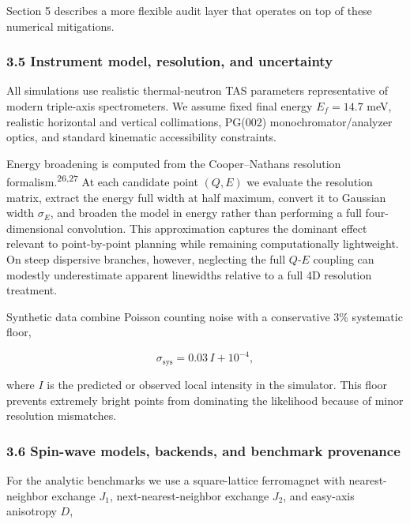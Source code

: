 \documentclass[
]{article}
\begin{document}
Section 5 describes a more flexible audit layer that operates on top of
these numerical mitigations.

\hypertarget{instrument-model-resolution-and-uncertainty}{%
\subsubsection{3.5 Instrument model, resolution, and
uncertainty}\label{instrument-model-resolution-and-uncertainty}}

All simulations use realistic thermal-neutron TAS parameters
representative of modern triple-axis spectrometers. We assume fixed
final energy \(E_f=14.7\) meV, realistic horizontal and vertical
collimations, PG(002) monochromator/analyzer optics, and standard
kinematic accessibility constraints.

Energy broadening is computed from the Cooper--Nathans resolution
formalism.\textsuperscript{26,27} At each candidate point \((Q,E)\) we
evaluate the resolution matrix, extract the energy full width at half
maximum, convert it to Gaussian width \(\sigma_E\), and broaden the
model in energy rather than performing a full four-dimensional
convolution. This approximation captures the dominant effect relevant to
point-by-point planning while remaining computationally lightweight. On
steep dispersive branches, however, neglecting the full \(Q\)-\(E\)
coupling can modestly underestimate apparent linewidths relative to a
full 4D resolution treatment.

Synthetic data combine Poisson counting noise with a conservative 3\%
systematic floor,

\[
\sigma_{\mathrm{sys}} = 0.03\,I + 10^{-4},
\]

where \(I\) is the predicted or observed local intensity in the
simulator. This floor prevents extremely bright points from dominating
the likelihood because of minor resolution mismatches.

\hypertarget{spin-wave-models-backends-and-benchmark-provenance}{%
\subsubsection{3.6 Spin-wave models, backends, and benchmark
provenance}\label{spin-wave-models-backends-and-benchmark-provenance}}

For the analytic benchmarks we use a square-lattice ferromagnet with
nearest-neighbor exchange \(J_1\), next-nearest-neighbor exchange
\(J_2\), and easy-axis anisotropy \(D\),
\end{document}
